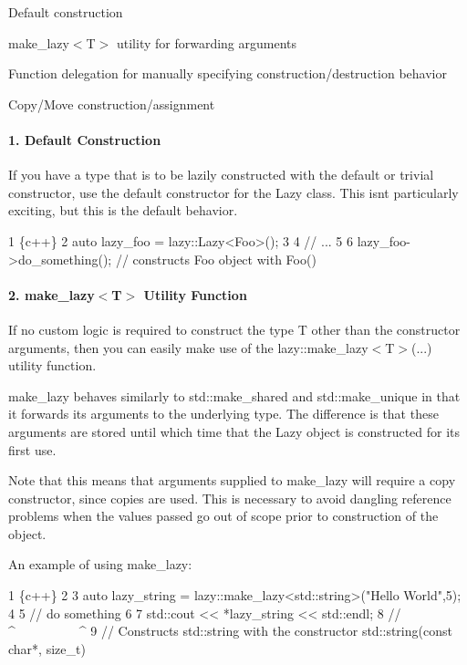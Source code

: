 \begin{DoxyEnumerate}
\item Default construction
\item {\ttfamily make\+\_\+lazy$<$T$>$} utility for forwarding arguments
\item Function delegation for manually specifying construction/destruction behavior
\item Copy/\+Move construction/assignment
\end{DoxyEnumerate}

\paragraph*{1. Default Construction}

If you have a type that is to be lazily constructed with the default or trivial constructor, use the default constructor for the {\ttfamily Lazy} class. This isn\textquotesingle{}t particularly exciting, but this is the default behavior.


\begin{DoxyCode}
1 \{c++\}
2 auto lazy\_foo = lazy::Lazy<Foo>();
3 
4 // ...
5 
6 lazy\_foo->do\_something(); // constructs Foo object with Foo()
\end{DoxyCode}


\paragraph*{2. {\ttfamily make\+\_\+lazy$<$T$>$} Utility Function}

If no custom logic is required to construct the type {\ttfamily T} other than the constructor arguments, then you can easily make use of the {\ttfamily lazy\+::make\+\_\+lazy$<$T$>$(...)} utility function.

{\ttfamily make\+\_\+lazy} behaves similarly to {\ttfamily std\+::make\+\_\+shared} and {\ttfamily std\+::make\+\_\+unique} in that it forwards its arguments to the underlying type. The difference is that these arguments are stored until which time that the {\ttfamily Lazy} object is constructed for its first use.

Note that this means that arguments supplied to {\ttfamily make\+\_\+lazy} will require a copy constructor, since copies are used. This is necessary to avoid dangling reference problems when the values passed go out of scope prior to construction of the object.

An example of using {\ttfamily make\+\_\+lazy}\+: 
\begin{DoxyCode}
1 \{c++\}
2 
3 auto lazy\_string = lazy::make\_lazy<std::string>("Hello World",5);
4 
5 // do something
6 
7 std::cout << *lazy\_string << std::endl; 
8 //           ^~~~~~~~~~~^
9 //           Constructs std::string with the constructor std::string(const char*, size\_t)
\end{DoxyCode}


